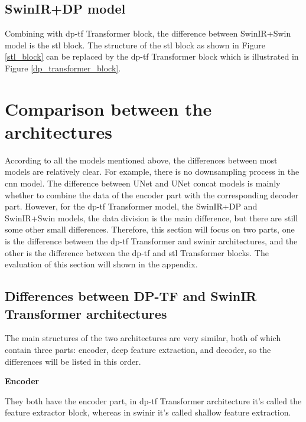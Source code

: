 \subsection{SwinIR+DP model}
Combining with \gls{dp}-\gls{tf} Transformer block, the difference between SwinIR+Swin model is the \gls{stl} block. The structure of the \gls{stl} block as shown in Figure \ref{stl_block} can be replaced by the \gls{dp}-\gls{tf} Transformer block which is illustrated in Figure \ref{dp_transformer_block}.

\section{Comparison between the architectures} \label{comparison between the architecture}
According to all the models mentioned above, the differences between most models are relatively clear. For example, there is no downsampling process in the \gls{cnn} model. The difference between UNet and UNet concat models is mainly whether to combine the data of the encoder part with the corresponding decoder part. However, for the \gls{dp}-\gls{tf} Transformer model, the SwinIR+DP and SwinIR+Swin models, the data division is the main difference, but there are still some other small differences. Therefore, this section will focus on two parts, one is the difference between the \gls{dp}-\gls{tf} Transformer and \gls{swinir} architectures, and the other is the difference between the \gls{dp}-\gls{tf} and \gls{stl} Transformer blocks. The evaluation of this section will shown in the appendix.

\subsection{Differences between DP-TF and SwinIR Transformer architectures}
The main structures of the two architectures are very similar, both of which contain three parts: encoder, deep feature extraction, and decoder, so the differences will be listed in this order.

\begin{spacing}{1.5}
\textbf{\large{Encoder}}
\end{spacing}
They both have the encoder part, in \gls{dp}-\gls{tf} Transformer architecture it's called the feature extractor block, whereas in \gls{swinir} it's called shallow feature extraction.

